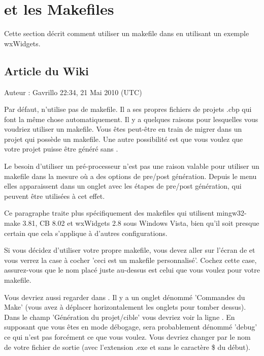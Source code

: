 \section{\codeblocks et les Makefiles}\label{sec:cb_makefiles}
Cette section décrit comment utiliser un makefile dans \codeblocks en utilisant un exemple wxWidgets.
\subsection{Article du Wiki}

Auteur : Gavrillo 22:34, 21 Mai 2010 (UTC)

Par défaut, \codeblocks n'utilise pas de makefile. Il a ses propres fichiers de projets .cbp qui font la même chose automatiquement. Il y a quelques raisons pour lesquelles vous voudriez utiliser un makefile. Vous êtes peut-être en train de migrer dans \codeblocks un projet qui possède un makefile. Une autre possibilité est que vous voulez que votre projet puisse être généré sans \codeblocks.

Le besoin d'utiliser un pré-processeur n'est pas une raison valable pour utiliser un makefile dans la mesure où \codeblocks a des options de pre/post génération. Depuis le menu  elles apparaissent dans un onglet avec les étapes de pre/post génération, qui peuvent être utilisées à cet effet.

Ce paragraphe traite plus spécifiquement des makefiles qui utilisent mingw32-make 3.81, CB 8.02 et wxWidgets 2.8 sous Windows Vista, bien qu'il soit presque certain que cela s'applique à d'autres configurations.

Si vous décidez d'utiliser votre propre makefile, vous devez aller sur l'écran de   et vous verrez la case à cocher 'ceci est un makefile personnalisé'. Cochez cette case, assurez-vous que le nom placé juste au-dessus est celui que vous voulez pour votre makefile.

Vous devriez aussi regarder dans . Il y a un onglet dénommé 'Commandes du Make' (vous avez à déplacer horizontalement les onglets pour tomber dessus). Dans le champ 'Génération du projet/cible' vous devriez voir la ligne . En supposant que vous êtes en mode débogage,  sera probablement dénommé 'debug' ce qui n'est pas forcément ce que vous voulez. Vous devriez changer  par le nom de votre fichier de sortie (avec l'extension .exe et sans le caractère \$ du début).

